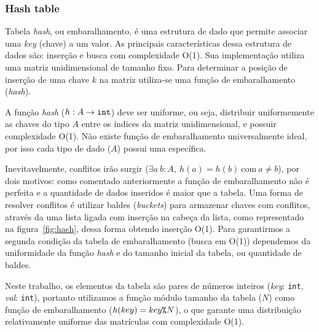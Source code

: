 \subsubsection{Hash table}
\label{sec:hash}

Tabela \textit{hash}, ou embaralhamento, é uma estrutura de dado que permite
associar uma \textit{key} (chave) a um valor. As principais características
dessa estrutura de dados são: inserção e busca com complexidade O(1). Sua
implementação utiliza uma matriz unidimensional de tamanho fixo.
Para determinar a posição de inserção de uma chave $k$ na matriz utiliza-se
uma função de embaralhamento (\textit{hash}).

A função \textit{hash} ($h: A \rightarrow \text{\texttt{int}}$) deve ser
uniforme, ou seja, distribuir uniformemente as chaves do tipo $A$ entre os
índices da matriz unidimensional, e possuir complexidade O(1).
Não existe função de embaralhamento universalmente ideal, por isso cada tipo de
dado ($A$) possui uma específica.

Inevitavelmente, conflitos irão surgir ($\exists a~b: A,~ h(a) = h(b)~\text{com}
~a \neq b$), por
dois motivos: como comentado anteriormente a função de embaralhamento
não é perfeita e a quantidade de dados inseridos é maior que a tabela. Uma forma
de resolver conflitos é utilizar baldes (\textit{buckets}) para armazenar chaves
com conflitos, através da uma lista ligada com inserção na cabeça da lista,
como representado na figura~\ref{fig:hash}, dessa forma obtendo inserção O(1).
Para garantirmos a segunda condição da tabela de embaralhamento (busca em O(1))
dependemos da uniformidade da função \textit{hash} e do tamanho inicial da
tabela, ou quantidade de baldes.

Neste trabalho, os elementos da tabela são pares de números inteiros (\textit{key}:
\texttt{int}, \textit{val}: \texttt{int}), portanto utilizamos a função módulo
tamanho da tabela ($N$) como função de embaralhamento ($h(key) = key \text{\texttt{\%}} N$),
o que garante uma distribuição relativamente uniforme das matrículas com complexidade O(1).

